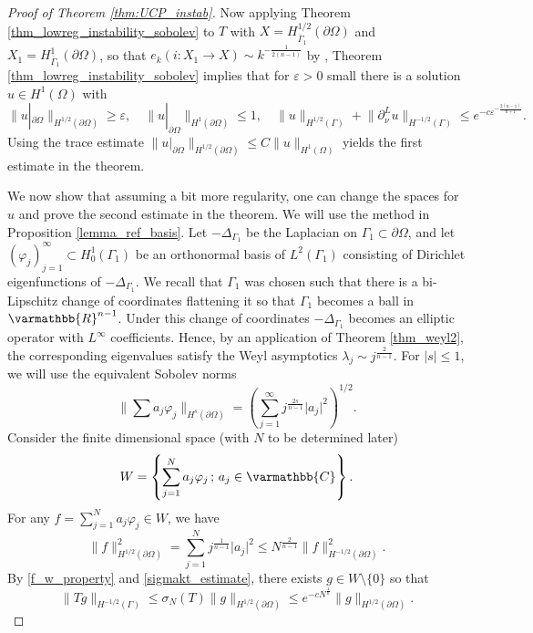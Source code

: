 \documentclass[12pt,twoside]{amsart}
\numberwithin{equation}{section}
\renewcommand{\leq}{\leqslant}
\renewcommand{\geq}{\geqslant}
\renewcommand{\mathbb}{\varmathbb}
\newcommand {\p} {\partial}
\newcommand {\D} {\Delta}
\newcommand{\mR}{\mathbb{R}}                    %
\newcommand{\mC}{\mathbb{C}}                    %
\newcommand{\abs}[1]{\lvert #1 \rvert}          %
\newcommand{\norm}[1]{\lVert #1 \rVert}         %
\newcommand{\ol}[1]{\overline{#1}}
\newcommand{\eps}{\varepsilon}
\begin{document}
\begin{proof}[Proof of Theorem \ref{thm:UCP_instab}]
Now applying Theorem \ref{thm_lowreg_instability_sobolev} to $T$ with $X = H^{1/2}_{\ol{\Gamma}_1}(\p \Omega)$ and $X_1 = H^{1}_{\ol{\Gamma}_1}(\p \Omega)$, so that $e_k(i: X_1 \to X) \sim k^{-\frac{1}{2(n-1)}}$ by \cite[Theorem 20.6]{Triebel_fractals}, Theorem \ref{thm_lowreg_instability_sobolev} implies that for $\eps > 0$ small there is a solution $u \in H^1(\Omega)$ with 
\[
\norm{u|_{\p \Omega}}_{H^{1/2}(\p \Omega)} \geq \eps, \quad \norm{u|_{\p \Omega}}_{H^{1}(\p \Omega)} \leq 1, \quad \norm{u}_{H^{1/2}(\Gamma)} + \norm{\p_{\nu}^L u}_{H^{-1/2}(\Gamma)} \leq e^{-c \eps^{-\frac{2(n-1)}{n+1}}}.
\]
Using the trace estimate $\norm{u|_{\p \Omega}}_{H^{1/2}(\p \Omega)}  \leq C \norm{u}_{H^1(\Omega)}$ yields the first estimate in the theorem.

We now show that assuming a bit more regularity, one can change the spaces for $u$ and prove the second estimate in the theorem. We will use the method in Proposition \ref{lemma_ref_basis}. Let $-\Delta_{\Gamma_1}$ be the Laplacian on $\Gamma_1 \subset \p \Omega$, and let $(\varphi_j)_{j=1}^{\infty} \subset H^1_0(\Gamma_1)$ be an orthonormal basis of $L^2(\Gamma_1)$ consisting of Dirichlet eigenfunctions of $-\Delta_{\Gamma_1}$. We recall that $\Gamma_1$ was chosen such that there is a bi-Lipschitz change of coordinates flattening it so that $\Gamma_1$ becomes a ball in $\mR^{n-1}$. Under this change of coordinates $-\D_{\Gamma_1}$ becomes an elliptic operator with $L^{\infty}$ coefficients. Hence, by an application of Theorem \ref{thm_weyl2}, the corresponding eigenvalues satisfy the Weyl asymptotics $\lambda_j \sim j^{\frac{2}{n-1}}$.
For $\abs{s} \leq 1$, we will use the equivalent Sobolev norms 
\[
\norm{\sum a_j \varphi_j}_{H^s(\p \Omega)} = \left( \sum_{j=1}^{\infty} j^{\frac{2s}{n-1}} \abs{a_j}^2 \right)^{1/2}.
\]
Consider the finite dimensional space (with $N$ to be determined later) 
\[
W = \left\{ \sum_{j=1}^N a_j \varphi_j \,;\, a_j \in \mC \right\}.
\]
For any $f = \sum_{j=1}^N a_j \varphi_j \in W$, we have 
\begin{equation} \label{g_sobolev_change}
\norm{f}_{H^{1/2}(\p \Omega)}^2 = \sum_{j=1}^N j^{\frac{1}{n-1}} \abs{a_j}^2 \leq N^{\frac{2}{n-1}} \norm{f}_{H^{-1/2}(\p \Omega)}^2.
\end{equation}
By \eqref{f_w_property} and \eqref{sigmakt_estimate}, there exists $g \in W \setminus \{0\}$ so that 
\[
\norm{Tg}_{H^{-1/2}(\Gamma)} \leq \sigma_N(T) \norm{g}_{H^{1/2}(\p \Omega)} \leq e^{-c N^{\frac{1}{n}}} \norm{g}_{H^{1/2}(\p \Omega)}.
\]


\end{proof}
\end{document}
